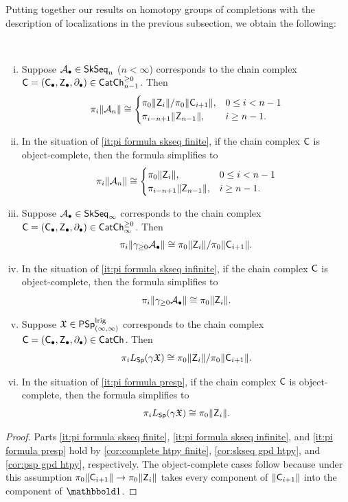 \documentclass[a4paper,11pt]{article}
\begin{document}
Putting together our results on homotopy groups of completions with
the description of localizations in the previous subsection, we obtain
the following:
\begin{cor}\label{cor:pi of completion of locn}\ 
  \begin{enumerate}[(i)]
  \item\label{it:pi formula skseq finite} Suppose $\mathcal{A}_{\bullet} \in \textup{\textsf{SkSeq}}_{n}$ ($n < \infty$) corresponds
    to the chain complex $\textup{\textsf{C}} = (\textup{\textsf{C}}_{\bullet}, \textup{\textsf{Z}}_{\bullet},
    \partial_{\bullet}) \in \textup{\textsf{CatCh}}^{\geq 0}_{n-1}$. Then
    \[ \pi_{i} \| \mathcal{A}_{n}\|
      \cong
      \begin{cases}
        \pi_{0}\|\textup{\textsf{Z}}_{i}\|/\pi_{0}\|\textup{\textsf{C}}_{i+1}\|, & 0 \leq i < n-1 \\
        \pi_{i-n+1} \|\textup{\textsf{Z}}_{n-1}\|, & i \geq n-1.
      \end{cases}
    \]
  \item In the situation of \ref{it:pi formula skseq finite}, if the
    chain complex $\textup{\textsf{C}}$ is object-complete, then the formula simplifies to
        \[ \pi_{i} \| \mathcal{A}_{n}\|
      \cong
      \begin{cases}
        \pi_{0}\|\textup{\textsf{Z}}_{i}\|, & 0 \leq i < n-1 \\
        \pi_{i-n+1} \|\textup{\textsf{Z}}_{n-1}\|, & i \geq n-1.
      \end{cases}
    \]
  \item\label{it:pi formula skseq infinite} Suppose $\mathcal{A}_{\bullet} \in \textup{\textsf{SkSeq}}_{\infty}$ corresponds
    to the chain complex $\textup{\textsf{C}} = (\textup{\textsf{C}}_{\bullet}, \textup{\textsf{Z}}_{\bullet},
    \partial_{\bullet}) \in \textup{\textsf{CatCh}}^{\geq 0}_{\infty}$. Then
    \[ \pi_{i} \|\gamma_{\geq 0}\mathcal{A}_{\bullet}\| 
      \cong \pi_{0}\|\textup{\textsf{Z}}_{i}\|/\pi_{0}\|\textup{\textsf{C}}_{i+1}\|.
    \]
  \item In the situation of \ref{it:pi formula skseq infinite}, if the
    chain complex $\textup{\textsf{C}}$ is object-complete, then the formula simplifies to
    \[ \pi_{i} \|\gamma_{\geq 0}\mathcal{A}_{\bullet}\| 
      \cong \pi_{0}\|\textup{\textsf{Z}}_{i}\|.
    \]
  \item\label{it:pi formula presp} Suppose $\mathfrak{X} \in \textup{\textsf{PSp}}_{(\infty,\infty)}^{\text{\textup{lrig}}}$ corresponds
    to the chain complex $\textup{\textsf{C}} = (\textup{\textsf{C}}_{\bullet}, \textup{\textsf{Z}}_{\bullet},
    \partial_{\bullet}) \in \textup{\textsf{CatCh}}$. Then
    \[ \pi_{i} L_{\textup{\textsf{Sp}}}(\gamma \mathfrak{X}) \cong 
      \pi_{0} \|\textup{\textsf{Z}}_{i}\|/\pi_{0} \|\textup{\textsf{C}}_{i+1}\|.
    \]
  \item In the situation of \ref{it:pi formula presp}, if the
    chain complex $\textup{\textsf{C}}$ is object-complete, then the formula simplifies to
    \[ \pi_{i} L_{\textup{\textsf{Sp}}}(\gamma \mathfrak{X}) \cong 
      \pi_{0} \|\textup{\textsf{Z}}_{i}\|.
    \]
  \end{enumerate}
\end{cor}
\begin{proof}
  Parts \ref{it:pi formula skseq finite}, \ref{it:pi formula skseq
    infinite}, and \ref{it:pi formula presp} hold by
  \cref{cor:complete htpy finite}, \cref{cor:skseq gpd htpy}, and
  \cref{cor:psp gpd htpy}, respectively.
  The object-complete cases follow because under this assumption
  $\pi_{0}\Lgpd{\oC_{i+1}} \to \pi_{0}\Lgpd{\oZ_{i}}$ takes every
  component of $\|\textup{\textsf{C}}_{i+1}\|$ into the component of $\bbone$.
\end{proof}
\end{document}
